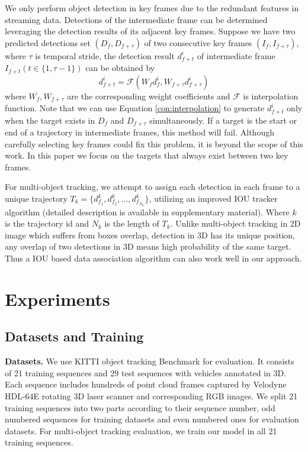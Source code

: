 \documentclass{bmvc2k}
\begin{document}
We only perform object detection in key frames due to the redundant features in streaming data. Detections of the intermediate frame can be determined leveraging the detection results of its adjacent key frames. Suppose we have two predicted detections set $(D_f, D_{f+\tau})$ of two consecutive key frames $(I_f, I_{f+\tau})$, where $\tau$ is temporal stride, the detection result $d^i_{f+t}$  of intermediate frame $I_{f+t} (t \in \{1, \tau-1\})$ can be obtained by
\begin{equation}
d^i_{f+t} = \mathcal{F}(W_f d^i_f, W_{f+\tau} d^i_{f+\tau}) \label{con:interpolation}
\end{equation}
where $W_f, W_{f+\tau}$ are the corresponding weight coefficients and $\mathcal{F}$ is interpolation function. Note that we can use Equation \eqref{con:interpolation} to generate $d^i_{f+t}$ only when the target exists in $D_f$ and $D_{f+\tau}$ simultaneously. If a target is the start or end of a trajectory in intermediate frames, this method will fail. Although carefully selecting key frames could fix this problem, it is beyond the scope of this work. In this paper we focus on the targets that always exist between two key frames.

For multi-object tracking, we attempt to assign each detection in each frame to a unique trajectory $T_k = \{d^k_{f_1}, d^k_{f_2}, ..., d^k_{f_{N_k}}\}$, utilizing an improved IOU tracker algorithm\cite{bochinski2018extending} (detailed description is available in supplementary material). Where $k$ is the trajectory id and $N_k$ is the length of $T_k$. Unlike multi-object tracking in 2D image which suffers from boxes overlap, detection in 3D has its unique position, any overlap of two detections in 3D means high probability of the same target. Thus a IOU based data association algorithm can also work well in our approach.

\section{Experiments}
\label{sec:experiments}

\subsection{Datasets and Training}

\textbf{Datasets.} We use KITTI object tracking Benchmark \cite{geiger2013vision} for evaluation. It consists of 21 training sequences and 29 test sequences with vehicles annotated in 3D. Each sequence includes hundreds of point cloud frames captured by Velodyne HDL-64E rotating 3D laser scanner and corresponding RGB images. We split 21 training sequences into two parts according to their sequence number, odd numbered sequences for training datasets and even numbered ones for evaluation datasets. For multi-object tracking evaluation, we train our model in all 21 training sequences.
\end{document}
